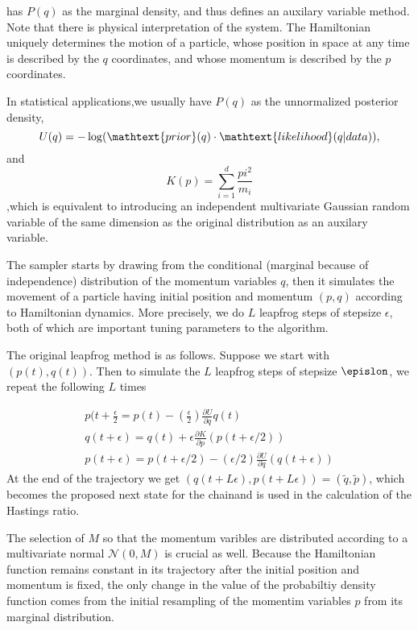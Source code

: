 \documentclass{book}
\begin{document}
\begin{enumerate}
has $P(q)$ as the marginal density, and thus defines an auxilary variable method. Note that there is physical interpretation of the system. The Hamiltonian uniquely determines the motion of a particle, whose position in space at any time is described by the $q$ coordinates, and whose momentum is described by the $p$ coordinates.

In statistical applications,we usually have $P(q)$ as the unnormalized posterior
density, 
\[U(q) = -\log(\mathtext{prior}(q) \cdot \mathtext{likelihood}(q|data) ), \]
and 
\[K(p) = \sum_{i=1}^d \frac{pi^2}{m_i} \]
,which is equivalent to introducing an independent multivariate Gaussian random variable of
the same dimension as the original distribution as an auxilary variable. 

The sampler starts by drawing from the conditional (marginal because of
independence) distribution of the momentum variables $q$, then it simulates the
movement of a particle having initial position and momentum $(p,q)$ according to
Hamiltonian dynamics. More precisely, we do $L$ leapfrog steps of stepsize
$\epsilon$, both of which are important tuning parameters to the algorithm.

The original leapfrog method is as follows. Suppose we start with $(p(t),q(t))$.
Then to simulate the $L$ leapfrog steps of stepsize $\epislon$, we repeat the
following $L$ times

\begin{align}
    p(t+\frac{\epsilon}{2} = p(t) - (\frac{\epsilon}{2}) \frac{\partial
    U}{\partial
    q}q(t) \\
    q(t+\epsilon) = q(t) + \epsilon  \frac{\partial K}{\partial p}(p(t+\epsilon/2))
    \\
    p(t+\epsilon) = p(t + \epsilon/2) - (\epsilon /2) \frac{\partial U}{\partial
    q}(q(t+\epsilon))
\end{align}
At the end of the trajectory we get $(q(t+L \epsilon),p(t+L \epsilon)) =
(\tilde{q}, \tilde{p})$, which becomes the proposed next state for the chainand
is used in the calculation of the Hastings ratio.

The selection of $M$ so that the momentum varibles are distributed according to
a multivariate normal $\mathcal{N}(0, M)$ is crucial as well. Because the
Hamiltonian function remains constant in its trajectory after the initial
position and momentum is fixed, the only change in the value of the probabiltiy
density function comes from the initial resampling of the momentim variables $p$
from its marginal distribution.


\end{enumerate}
\end{document}
